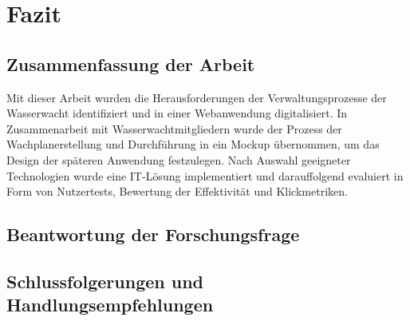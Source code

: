 \documentclass[fontsize=12pt,openright,oneside,paper=a4,BCOR=1cm]{scrbook}
\begin{document}



%
%

\renewcommand{\cleardoublepage}{}
\chapter{Fazit}

\section{Zusammenfassung der Arbeit}
Mit dieser Arbeit wurden die Herausforderungen der Verwaltungsprozesse der Wasserwacht identifiziert und in einer Webanwendung digitalisiert. In Zusammenarbeit mit Wasserwachtmitgliedern wurde der Prozess der Wachplanerstellung und Durchführung in ein Mockup übernommen, um das Design der späteren Anwendung festzulegen. Nach Auswahl geeigneter Technologien wurde eine IT-Lösung implementiert und darauffolgend evaluiert in Form von Nutzertests, Bewertung der Effektivität und Klickmetriken. 

\section{Beantwortung der Forschungsfrage}




\section{Schlussfolgerungen und Handlungsempfehlungen}

%
%
\end{document}
